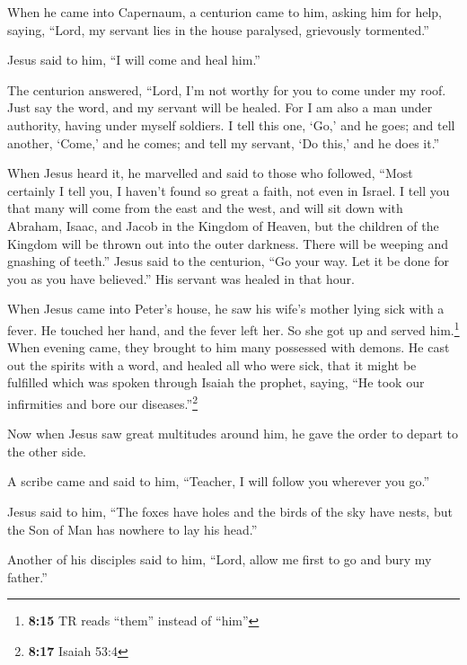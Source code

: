  When he came into Capernaum, a centurion came to him,
asking him for help,  saying, ``Lord, my servant lies in
the house paralysed, grievously tormented.''

 Jesus said to him, ``I will come and heal him.''

 The centurion answered, ``Lord, I'm not worthy for you to
come under my roof. Just say the word, and my servant will be healed.
 For I am also a man under authority, having under myself
soldiers. I tell this one, `Go,' and he goes; and tell another, `Come,'
and he comes; and tell my servant, `Do this,' and he does it.''

 When Jesus heard it, he marvelled and said to those who
followed, ``Most certainly I tell you, I haven't found so great a faith,
not even in Israel.  I tell you that many will come from
the east and the west, and will sit down with Abraham, Isaac, and Jacob
in the Kingdom of Heaven,  but the children of the
Kingdom will be thrown out into the outer darkness. There will be
weeping and gnashing of teeth.''  Jesus said to the
centurion, ``Go your way. Let it be done for you as you have believed.''
His servant was healed in that hour.

 When Jesus came into Peter's house, he saw his wife's
mother lying sick with a fever.  He touched her hand, and
the fever left her. So she got up and served him.\footnote{\textbf{8:15}
  TR reads ``them'' instead of ``him''}  When evening
came, they brought to him many possessed with demons. He cast out the
spirits with a word, and healed all who were sick,  that
it might be fulfilled which was spoken through Isaiah the prophet,
saying, ``He took our infirmities and bore our diseases.''\footnote{\textbf{8:17}
  Isaiah 53:4}

 Now when Jesus saw great multitudes around him, he gave
the order to depart to the other side.

 A scribe came and said to him, ``Teacher, I will follow
you wherever you go.''

 Jesus said to him, ``The foxes have holes and the birds
of the sky have nests, but the Son of Man has nowhere to lay his head.''

 Another of his disciples said to him, ``Lord, allow me
first to go and bury my father.''

